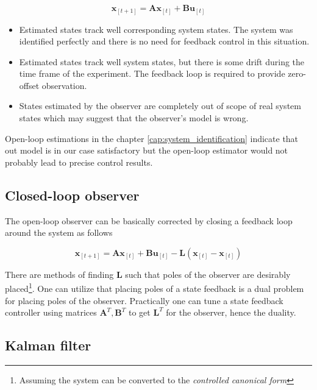 \begin{equation}
\textbf{\^x}_{[t+1]} = \textbf{A}\textbf{\^x}_{[t]} + \textbf{B}\textbf{u}_{[t]}
\label{eq:openloop_observer}
\end{equation}

\begin{itemize}
\item Estimated states track well corresponding system states. The system was identified perfectly and there is no need for feedback control in this situation.
\item Estimated states track well system states, but there is some drift during the time frame of the experiment. The feedback loop is required to provide zero-offset observation.
\item States estimated by the observer are completely out of scope of real system states which may suggest that the observer's model is wrong.
\end{itemize}

Open-loop estimations in the chapter \ref{cap:system_identification} indicate that out model is in our case satisfactory but the open-loop estimator would not probably lead to precise control results.

\subsection{Closed-loop observer}

The open-loop observer can be basically corrected by closing a feedback loop around the system as follows

\begin{equation}
\textbf{\^x}_{[t+1]} = \textbf{A}\textbf{\^x}_{[t]} + \textbf{B}\textbf{u}_{[t]} - \textbf{L}\left(\textbf{x}_{[t]} - \textbf{\^x}_{[t]}\right)
\label{eq:closed_loop_observer}
\end{equation}

There are methods of finding $\textbf{L}$ such that poles of the observer are desirably placed\footnote{Assuming the system can be converted to the \textit{controlled canonical form}}. One can utilize that placing poles of a state feedback is a dual problem for placing poles of the observer. Practically one can tune a state feedback controller using matrices $\textbf{A}^T, \textbf{B}^T$ to get $\textbf{L}^T$ for the observer, hence the duality.

\subsection{Kalman filter}

